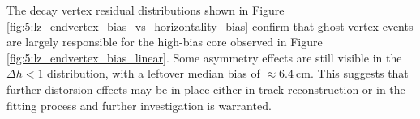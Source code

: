 
The \lz decay vertex residual distributions shown in Figure \ref{fig:5:lz_endvertex_bias_vs_horizontality_bias} confirm that ghost vertex events are largely responsible for the high-bias core observed in Figure \ref{fig:5:lz_endvertex_bias_linear}.
Some asymmetry effects are still visible in the $\Delta h < 1$ distribution, with a leftover median bias of $\approx \SI{6.4}{\centi\meter}$.
This suggests that further distorsion effects may be in place either in track reconstruction or in the fitting process and further investigation is warranted.


